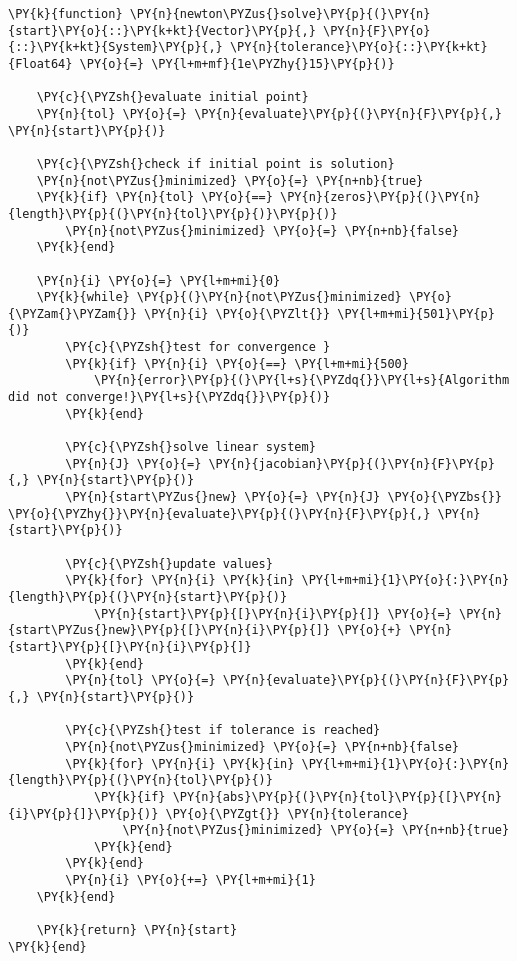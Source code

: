 \documentclass[11pt]{article}
\begin{document}
    \begin{tcolorbox}[breakable, size=fbox, boxrule=1pt, pad at break*=1mm,colback=cellbackground, colframe=cellborder]
\begin{Verbatim}[commandchars=\\\{\}]
\PY{k}{function} \PY{n}{newton\PYZus{}solve}\PY{p}{(}\PY{n}{start}\PY{o}{::}\PY{k+kt}{Vector}\PY{p}{,} \PY{n}{F}\PY{o}{::}\PY{k+kt}{System}\PY{p}{,} \PY{n}{tolerance}\PY{o}{::}\PY{k+kt}{Float64} \PY{o}{=} \PY{l+m+mf}{1e\PYZhy{}15}\PY{p}{)}

    \PY{c}{\PYZsh{}evaluate initial point}
    \PY{n}{tol} \PY{o}{=} \PY{n}{evaluate}\PY{p}{(}\PY{n}{F}\PY{p}{,} \PY{n}{start}\PY{p}{)}

    \PY{c}{\PYZsh{}check if initial point is solution}
    \PY{n}{not\PYZus{}minimized} \PY{o}{=} \PY{n+nb}{true}
    \PY{k}{if} \PY{n}{tol} \PY{o}{==} \PY{n}{zeros}\PY{p}{(}\PY{n}{length}\PY{p}{(}\PY{n}{tol}\PY{p}{)}\PY{p}{)}
        \PY{n}{not\PYZus{}minimized} \PY{o}{=} \PY{n+nb}{false}
    \PY{k}{end}
    
    \PY{n}{i} \PY{o}{=} \PY{l+m+mi}{0}
    \PY{k}{while} \PY{p}{(}\PY{n}{not\PYZus{}minimized} \PY{o}{\PYZam{}\PYZam{}} \PY{n}{i} \PY{o}{\PYZlt{}} \PY{l+m+mi}{501}\PY{p}{)}
        \PY{c}{\PYZsh{}test for convergence }
        \PY{k}{if} \PY{n}{i} \PY{o}{==} \PY{l+m+mi}{500}
            \PY{n}{error}\PY{p}{(}\PY{l+s}{\PYZdq{}}\PY{l+s}{Algorithm did not converge!}\PY{l+s}{\PYZdq{}}\PY{p}{)}
        \PY{k}{end}

        \PY{c}{\PYZsh{}solve linear system}
        \PY{n}{J} \PY{o}{=} \PY{n}{jacobian}\PY{p}{(}\PY{n}{F}\PY{p}{,} \PY{n}{start}\PY{p}{)}
        \PY{n}{start\PYZus{}new} \PY{o}{=} \PY{n}{J} \PY{o}{\PYZbs{}} \PY{o}{\PYZhy{}}\PY{n}{evaluate}\PY{p}{(}\PY{n}{F}\PY{p}{,} \PY{n}{start}\PY{p}{)}

        \PY{c}{\PYZsh{}update values}
        \PY{k}{for} \PY{n}{i} \PY{k}{in} \PY{l+m+mi}{1}\PY{o}{:}\PY{n}{length}\PY{p}{(}\PY{n}{start}\PY{p}{)}
            \PY{n}{start}\PY{p}{[}\PY{n}{i}\PY{p}{]} \PY{o}{=} \PY{n}{start\PYZus{}new}\PY{p}{[}\PY{n}{i}\PY{p}{]} \PY{o}{+} \PY{n}{start}\PY{p}{[}\PY{n}{i}\PY{p}{]}
        \PY{k}{end}
        \PY{n}{tol} \PY{o}{=} \PY{n}{evaluate}\PY{p}{(}\PY{n}{F}\PY{p}{,} \PY{n}{start}\PY{p}{)}

        \PY{c}{\PYZsh{}test if tolerance is reached}
        \PY{n}{not\PYZus{}minimized} \PY{o}{=} \PY{n+nb}{false}
        \PY{k}{for} \PY{n}{i} \PY{k}{in} \PY{l+m+mi}{1}\PY{o}{:}\PY{n}{length}\PY{p}{(}\PY{n}{tol}\PY{p}{)}
            \PY{k}{if} \PY{n}{abs}\PY{p}{(}\PY{n}{tol}\PY{p}{[}\PY{n}{i}\PY{p}{]}\PY{p}{)} \PY{o}{\PYZgt{}} \PY{n}{tolerance}
                \PY{n}{not\PYZus{}minimized} \PY{o}{=} \PY{n+nb}{true}
            \PY{k}{end}
        \PY{k}{end}
        \PY{n}{i} \PY{o}{+=} \PY{l+m+mi}{1}
    \PY{k}{end}

    \PY{k}{return} \PY{n}{start}
\PY{k}{end}
\end{Verbatim}
\end{tcolorbox}
\end{document}
